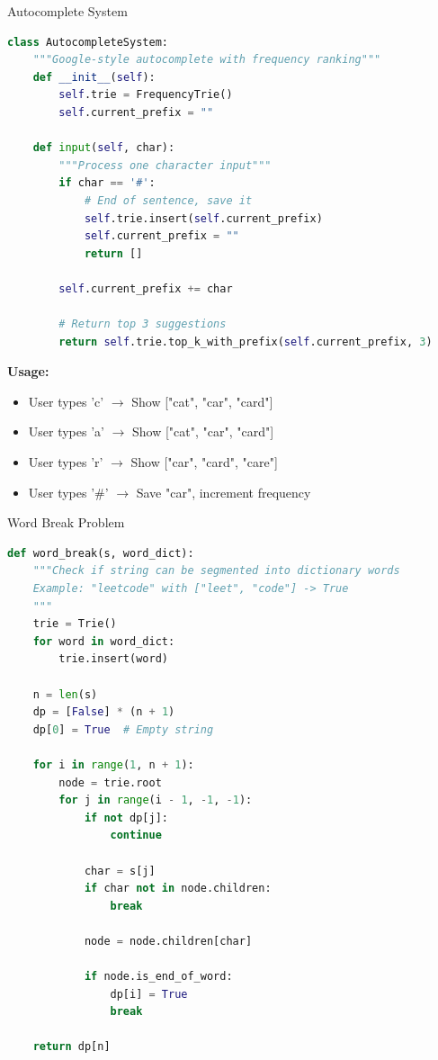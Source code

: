 \documentclass[aspectratio=169]{beamer}
\begin{document}
\begin{frame}[fragile]{Autocomplete System}
  \begin{lstlisting}[language=Python, basicstyle=\ttfamily\footnotesize]
class AutocompleteSystem:
    """Google-style autocomplete with frequency ranking"""
    def __init__(self):
        self.trie = FrequencyTrie()
        self.current_prefix = ""

    def input(self, char):
        """Process one character input"""
        if char == '#':
            # End of sentence, save it
            self.trie.insert(self.current_prefix)
            self.current_prefix = ""
            return []

        self.current_prefix += char

        # Return top 3 suggestions
        return self.trie.top_k_with_prefix(self.current_prefix, 3)
  \end{lstlisting}

  \vspace{0.3cm}
  \textbf{Usage:}
  \begin{itemize}
    \item User types 'c' $\rightarrow$ Show ["cat", "car", "card"]
    \item User types 'a' $\rightarrow$ Show ["cat", "car", "card"]
    \item User types 'r' $\rightarrow$ Show ["car", "card", "care"]
    \item User types '\#' $\rightarrow$ Save "car", increment frequency
  \end{itemize}
\end{frame}

\begin{frame}[fragile]{Word Break Problem}
  \begin{lstlisting}[language=Python, basicstyle=\ttfamily\footnotesize]
def word_break(s, word_dict):
    """Check if string can be segmented into dictionary words
    Example: "leetcode" with ["leet", "code"] -> True
    """
    trie = Trie()
    for word in word_dict:
        trie.insert(word)

    n = len(s)
    dp = [False] * (n + 1)
    dp[0] = True  # Empty string

    for i in range(1, n + 1):
        node = trie.root
        for j in range(i - 1, -1, -1):
            if not dp[j]:
                continue

            char = s[j]
            if char not in node.children:
                break

            node = node.children[char]

            if node.is_end_of_word:
                dp[i] = True
                break

    return dp[n]
  \end{lstlisting}
\end{frame}
\end{document}
